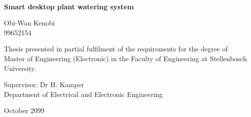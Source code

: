 \graphicspath{{frontmatter/fig/}}

\begin{titlepage}
\begin{center}



~\vspace{4.5em}

{\sffamily \bfseries \huge Smart desktop plant watering system \par}

\vspace{7em}

{\large {\Large Obi-Wan Kenobi} \\ 99652154 \par}

\vspace{8em}

{\large Thesis presented in partial fulfilment of the requirements for the degree of \\ Master of Engineering (Electronic) in the Faculty of Engineering at Stellenbosch University. \par}

\vfill

{\large {Supervisor}: Dr H. Kamper \\
Department of Electrical and Electronic Engineering \par}

\vspace{10em}

{\Large October 2099}
\end{center}
\end{titlepage}
